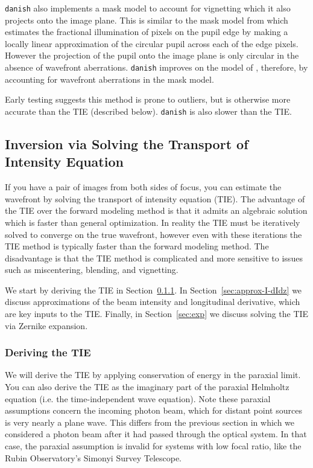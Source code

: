 \documentclass[TS,authoryear,toc]{lsstdoc}
\begin{document}
\texttt{danish} also implements a mask model to account for vignetting which it also projects onto the image plane.
This is similar to the mask model from \citet{janish2012} which estimates the fractional illumination of pixels on the pupil edge by making a locally linear approximation of the circular pupil across each of the edge pixels.
However the projection of the pupil onto the image plane is only circular in the absence of wavefront aberrations.
\texttt{danish} improves on the model of \citet{janish2012}, therefore, by accounting for wavefront aberrations in the mask model.

Early testing suggests this method is prone to outliers, but is otherwise more accurate than the TIE (described below).
\texttt{danish} is also slower than the TIE.


\subsection{Inversion via Solving the Transport of Intensity Equation}

If you have a pair of images from both sides of focus, you can estimate the wavefront by solving the transport of intensity equation (TIE).
The advantage of the TIE over the forward modeling method is that it admits an algebraic solution which is faster than general optimization.
In reality the TIE must be iteratively solved to converge on the true wavefront, however even with these iterations the TIE method is typically faster than the forward modeling method.
The disadvantage is that the TIE method is complicated and more sensitive to issues such as miscentering, blending, and vignetting.

We start by deriving the TIE in Section~\ref{sec:tie-derivation}.
In Section~\ref{sec:approx-I-dIdz} we discuss approximations of the beam intensity and longitudinal derivative, which are key inputs to the TIE.
Finally, in Section~\ref{sec:exp} we discuss solving the TIE via Zernike expansion.


\subsubsection{Deriving the TIE}
\label{sec:tie-derivation}

We will derive the TIE by applying conservation of energy in the paraxial limit.
You can also derive the TIE as the imaginary part of the paraxial Helmholtz equation (i.e. the time-independent wave equation).
Note these paraxial assumptions concern the incoming photon beam, which for distant point sources is very nearly a plane wave.
This differs from the previous section in which we considered a photon beam after it had passed through the optical system.
In that case, the paraxial assumption is invalid for systems with low focal ratio, like the Rubin Observatory's Simonyi Survey Telescope. 
\end{document}
